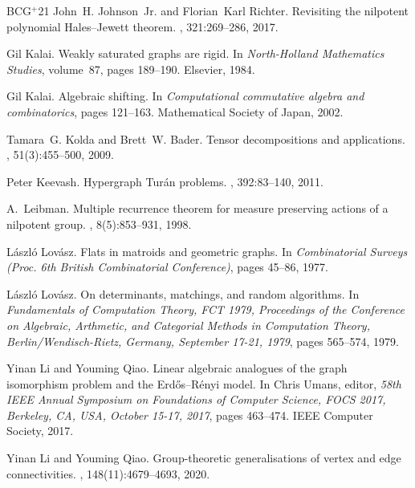 \documentclass[10pt]{article}
\newcommand{\etalchar}[1]{$^{#1}$}
\begin{document}
\begin{thebibliography}{BCG{\etalchar{+}}21}
John~H. Johnson~Jr. and Florian~Karl Richter.
\newblock Revisiting the nilpotent polynomial {Hales}--{Jewett} theorem.
, 321:269--286, 2017.

Gil Kalai.
\newblock Weakly saturated graphs are rigid.
\newblock In {\em North-Holland Mathematics Studies}, volume~87, pages
  189--190. Elsevier, 1984.

Gil Kalai.
\newblock Algebraic shifting.
\newblock In {\em Computational commutative algebra and combinatorics}, pages
  121--163. Mathematical Society of Japan, 2002.

Tamara~G. Kolda and Brett~W. Bader.
\newblock Tensor decompositions and applications.
, 51(3):455--500, 2009.

Peter Keevash.
\newblock Hypergraph {Tur{\'a}n} problems.
, 392:83--140, 2011.

A.~Leibman.
\newblock Multiple recurrence theorem for measure preserving actions of a
  nilpotent group.
, 8(5):853--931, 1998.

L{\'a}szl{\'o} Lov{\'a}sz.
\newblock Flats in matroids and geometric graphs.
\newblock In {\em Combinatorial Surveys (Proc. 6th British Combinatorial
  Conference)}, pages 45--86, 1977.

L{\'{a}}szl{\'{o}} Lov{\'{a}}sz.
\newblock On determinants, matchings, and random algorithms.
\newblock In {\em Fundamentals of Computation Theory, {FCT} 1979, Proceedings
  of the Conference on Algebraic, Arthmetic, and Categorial Methods in
  Computation Theory, Berlin/Wendisch-Rietz, Germany, September 17-21, 1979},
  pages 565--574, 1979.

Yinan Li and Youming Qiao.
\newblock Linear algebraic analogues of the graph isomorphism problem and the
  {Erd{\H{o}}s}--{R{\'{e}}nyi} model.
\newblock In Chris Umans, editor, {\em 58th {IEEE} Annual Symposium on
  Foundations of Computer Science, {FOCS} 2017, Berkeley, CA, USA, October
  15-17, 2017}, pages 463--474. {IEEE} Computer Society, 2017.

Yinan Li and Youming Qiao.
\newblock Group-theoretic generalisations of vertex and edge connectivities.
, 148(11):4679--4693, 2020.


\end{thebibliography}
\end{document}
